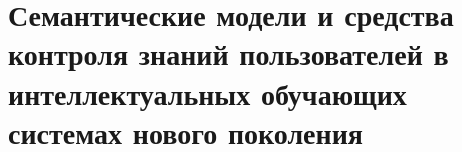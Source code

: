 \chapter{Семантические модели и средства контроля знаний пользователей в интеллектуальных обучающих системах нового поколения}
\label{chapter_knowledge_control}


%